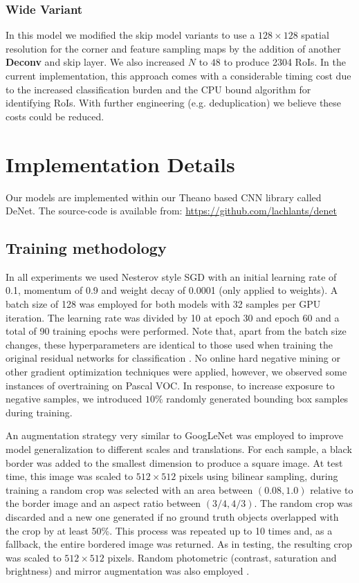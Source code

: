 \documentclass[10pt,twocolumn]{article}
\begin{document}
\subsubsection{Wide Variant}

In this model we modified the skip model variants to use a $128\times 128$ spatial resolution for the corner and feature sampling maps by the addition of another \textbf{Deconv} and skip layer. We also increased $N$ to $48$ to produce 2304 RoIs. In the current implementation, this approach comes with a considerable timing cost due to the increased classification burden and the CPU bound algorithm for identifying RoIs. With further engineering (e.g. deduplication) we believe these costs could be reduced.

\section{Implementation Details} \label{sec:implement} 

Our models are implemented within our Theano based CNN library called DeNet. The source-code is available from: \href{url}{https://github.com/lachlants/denet}

\subsection{Training methodology} \label{sec:training}

In all experiments we used Nesterov style SGD\cite{nesterov-sgd} with an initial learning rate of 0.1, 
momentum of 0.9 and weight decay of 0.0001 (only applied to weights). A batch size of 128 was employed for both models with 32 samples per GPU iteration. The learning rate was divided by 10 at epoch 30 and epoch 60 and a total of 90 training epochs were performed. Note that, apart from the batch size changes, these hyperparameters are identical to those used when training the original residual networks for classification \cite{resnet}. No online hard negative mining \cite{ohem} or other gradient optimization techniques were applied, however, we observed some instances of overtraining on Pascal VOC. In response, to increase exposure to negative samples, we introduced $10\%$ randomly generated bounding box samples during training.

An augmentation strategy very similar to GoogLeNet\cite{googlenet} was employed  to improve model generalization to different scales and translations. For each sample, a black border was added to the smallest dimension to produce a square image. At test time, this image was scaled to $512 \times 512$ pixels using bilinear sampling, during training a random crop was selected with an area between $(0.08,1.0)$ relative to the border image and an aspect ratio between $( 3/4, 4/3 )$. The random crop was discarded and a new one generated if no ground truth objects overlapped with the crop by at least 50\%. This process was repeated up to 10 times and, as a fallback, the entire bordered image was returned. As in testing, the resulting crop was scaled to $512 \times 512$ pixels. Random photometric (contrast, saturation and brightness) and mirror augmentation was also employed \cite{googlenet}. 
\end{document}
